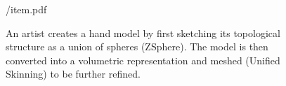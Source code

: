\providecommand{\yoff}{0}
\begin{figure}[t!]
\centering
\begin{overpic} 
[width=\linewidth]
{\currfiledir/item.pdf}
\end{overpic}
\caption{
% 
%
An artist creates a hand model by first sketching its topological structure as a union of spheres (ZSphere{\textcopyright}). The model is then converted into a volumetric representation and meshed (Unified Skinning{\textcopyright}) to be further refined.
% 
% 
}
\label{fig:zsphere}
\end{figure}